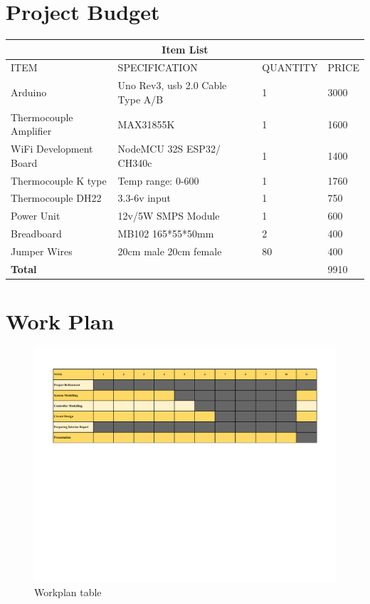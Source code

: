 \section{Project Budget}
\setlength{\arrayrulewidth}{0.5mm}
\setlength{\tabcolsep}{18pt}
\renewcommand{\arraystretch}{1.5}
\begin{tabular}{ |p{3cm}|p{3cm}|p{3cm}|p{3cm}|  }
	\hline
	\multicolumn{4}{|c|}{\textbf{Item List}} \\
	\hline
	ITEM & SPECIFICATION & QUANTITY & PRICE \\
	\hline
	Arduino & Uno Rev3, usb 2.0 Cable Type A/B & 1 & 3000 \\
	\hline
	Thermocouple Amplifier & MAX31855K & 1 & 1600 \\
	\hline
	WiFi Development Board & NodeMCU 32S ESP32/ CH340c  & 1 & 1400 \\
	\hline
	Thermocouple K type&Temp range: 0-600  & 1 & 1760\\
	\hline
	Thermocouple DH22 & 3.3-6v input  & 1 &750 \\
	\hline
	Power Unit & 12v/5W SMPS Module & 1   & 600\\
	\hline
	Breadboard & MB102  165*55*50mm & 2 & 400 \\
	\hline
	Jumper Wires & 20cm male 20cm female & 80 & 400 \\
	\hline
	\textbf{Total} & & &9910 \\
	\hline
\end{tabular}

\section{Work Plan}
\begin{figure}[!h]
	\includegraphics[width=1.059\linewidth]{Figures/workplan3}
	\caption{Workplan table}
\end{figure}
